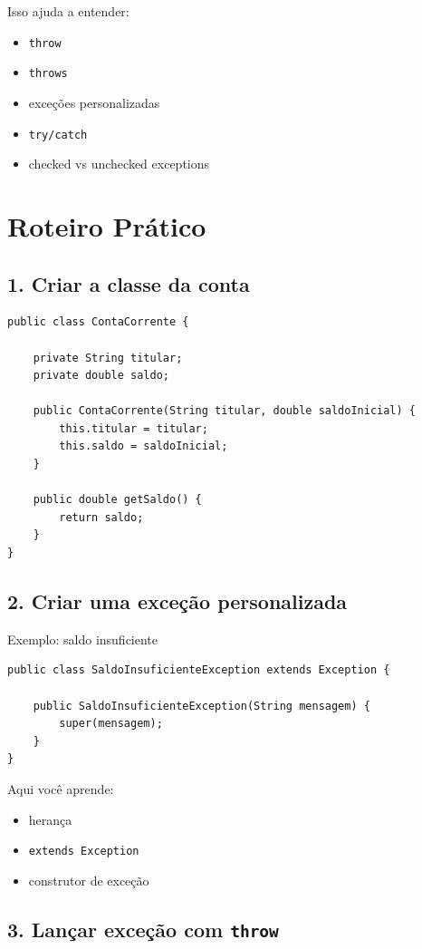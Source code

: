 \documentclass[12pt,a4paper]{article}
\begin{document}
Isso ajuda a entender:
\begin{itemize}
    \item \texttt{throw}
    \item \texttt{throws}
    \item exceções personalizadas
    \item \texttt{try/catch}
    \item checked vs unchecked exceptions
\end{itemize}

\section*{Roteiro Prático}

\subsection*{1. Criar a classe da conta}
\begin{lstlisting}
public class ContaCorrente {

    private String titular;
    private double saldo;

    public ContaCorrente(String titular, double saldoInicial) {
        this.titular = titular;
        this.saldo = saldoInicial;
    }

    public double getSaldo() {
        return saldo;
    }
}
\end{lstlisting}

\subsection*{2. Criar uma exceção personalizada}
Exemplo: saldo insuficiente
\begin{lstlisting}
public class SaldoInsuficienteException extends Exception {

    public SaldoInsuficienteException(String mensagem) {
        super(mensagem);
    }
}
\end{lstlisting}

Aqui você aprende:
\begin{itemize}
    \item herança
    \item \texttt{extends Exception}
    \item construtor de exceção
\end{itemize}

\subsection*{3. Lançar exceção com \texttt{throw}}
\end{document}
